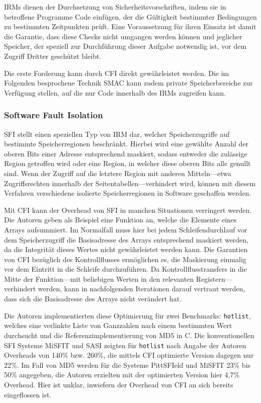 \documentclass[11pt]{article}
\begin{document}
IRMs dienen der Durchsetzung von Sicherheitsvorschriften, indem sie in
betroffene Programme Code einfügen, der die Gültigkeit bestimmter Bedingungen
zu bestimmten Zeitpunkten prüft. Eine Voraussetzung für ihren Einsatz ist damit
die Garantie, dass diese Checks nicht umgangen werden können und jeglicher
Speicher, der speziell zur Durchführung dieser Aufgabe notwendig ist, vor dem
Zugriff Dritter geschützt bleibt.

Die erste Forderung kann durch CFI direkt gewährleistet werden. Die im
Folgenden besprochene Technik SMAC kann zudem private Speicherbereiche zur
Verfügung stellen, auf die nur Code innerhalb des IRMs zugreifen kann.

\subsubsection{Software Fault Isolation}

SFI stellt einen speziellen Typ von IRM dar, welcher Speicherzugriffe auf
bestimmte Speicherregionen beschränkt. Hierbei wird eine gewählte Anzahl der
oberen Bits einer Adresse entsprechend maskiert, sodass entweder die zulässige
Region getroffen wird oder eine Region, in welcher diese oberen Bits alle
genullt sind. Wenn der Zugriff auf die letztere Region mit anderen Mitteln—etwa
Zugriffsrechten innerhalb der Seitentabellen—verhindert wird, können mit diesem
Verfahren verschiedene isolierte Speicherregionen in Software geschaffen
werden.

Mit CFI kann der Overhead von SFI in manchen Situationen verringert werden. Die
Autoren geben als Beispiel eine Funktion an, welche die Elemente eines Arrays
aufsummiert. Im Normalfall muss hier bei jedem Schleifendurchlauf vor dem
Speicherzugriff die Basisadresse des Arrays entsprechend maskiert werden, da
die Integrität dieses Wertes nicht gewährleistet werden kann. Die Garantien von
CFI bezüglich des Kontrollflusses ermöglichen es, die Maskierung einmalig vor
dem Eintritt in die Schleife durchzuführen. Da Kontrollflusstransfers in die
Mitte der Funktion—mit beliebigen Werten in den relevanten Registern—verhindert
werden, kann in nachfolgenden Iterationen darauf vertraut werden, dass sich die
Basisadresse des Arrays nicht verändert hat.

Die Autoren implementierten diese Optimierung für zwei Benchmarks:
\texttt{hotlist}, welches eine verlinkte Liste von Ganzzahlen nach einem
bestimmten Wert durchsucht und die Referenzimplementierung von MD5 in C. Die
konventionellen SFI Systeme MiSFIT und SASI zeigten für \texttt{hotlist} nach
Angabe der Autoren Overheads von 140\% bzw. 260\%, die mittels CFI optimierte
Version dagegen nur 22\%. Im Fall von MD5 werden für die Systeme PittSFIeld und
MiSFIT 23\% bis 50\% angegeben, die Autoren erzielten mit der optimierten
Version hier 4,7\% Overhead. Hier ist unklar, inwiefern der Overhead von CFI an
sich bereits eingeflossen ist.
\end{document}
